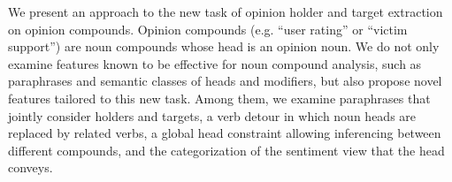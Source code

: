 We present an approach to the new task of opinion holder and target extraction on opinion compounds. Opinion compounds (e.g. ``user rating'' or ``victim support'') are noun compounds whose head is an opinion noun. We do not only examine features known to be effective for noun compound analysis, such as paraphrases and semantic classes of heads and modifiers, but also propose novel features tailored to this new task. Among them, we examine paraphrases that jointly consider holders and targets, a verb detour in which noun heads are replaced by related verbs, a global head constraint allowing inferencing between different compounds, and the categorization of the sentiment view that the head conveys.
